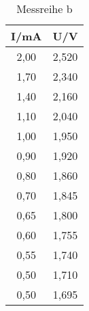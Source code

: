 

\begin{table}[h!]
  \centering
  \caption{Messreihe b}
  \label{tab:Gegen}
  \begin{tabular}{c c }
    \toprule
     I/mA  &	 U/V	   \\
    \midrule
  2,00 & 2,520\\
  1,70 & 2,340\\
  1,40 & 2,160\\
  1,10 & 2,040\\
  1,00 & 1,950\\
  0,90 & 1,920\\
  0,80 & 1,860\\
  0,70 & 1,845\\
  0,65 & 1,800\\
  0,60 & 1,755\\
  0,55 & 1,740\\
  0,50 & 1,710\\
  0,50 & 1,695\\

    \bottomrule
  \end{tabular}
\end{table}
